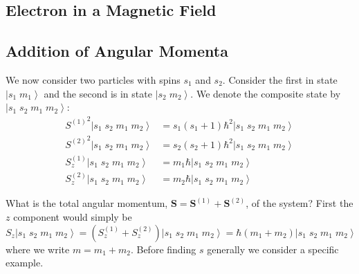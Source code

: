 \documentclass[12pt, a4paper, oneside, openright, titlepage]{book}
\newcommand{\ket}[1]{\left\vert#1\right\rangle}
\begin{document}
\subsection{Electron in a Magnetic Field}


\subsection{Addition of Angular Momenta}

We now consider two particles with spins $s_1$ and $s_2$. Consider the first in state $\ket{s_1\;m_1}$ and the second is in state $\ket{s_2\;m_2}$. We denote the composite state by $\ket{s_1\;s_2\;m_1\;m_2}$: \begin{align*}
    {S^{(1)}}^2\ket{s_1\;s_2\;m_1\;m_2} &= s_1(s_1+1)\hbar^2\ket{s_1\;s_2\;m_1\;m_2} \\
    {S^{(2)}}^2\ket{s_1\;s_2\;m_1\;m_2} &= s_2(s_2+1)\hbar^2\ket{s_1\;s_2\;m_1\;m_2} \\
    S_z^{(1)}\ket{s_1\;s_2\;m_1\;m_2} &= m_1\hbar \ket{s_1\;s_2\;m_1\;m_2} \\
    S_z^{(2)}\ket{s_1\;s_2\;m_1\;m_2} &= m_2\hbar \ket{s_1\;s_2\;m_1\;m_2}
\end{align*}

What is the total angular momentum, $\mathbf{S}= \mathbf{S}^{(1)}+\mathbf{S}^{(2)}$, of the system? First the $z$ component would simply be \begin{equation*}
    S_z\ket{s_1\;s_2\;m_1\;m_2} = (S_z^{(1)}+S_z^{(2)})\ket{s_1\;s_2\;m_1\;m_2} = \hbar(m_1+m_2)\ket{s_1\;s_2\;m_1\;m_2}
\end{equation*}
where we write $m = m_1+m_2$. Before finding $s$ generally we consider a specific example.
\end{document}
